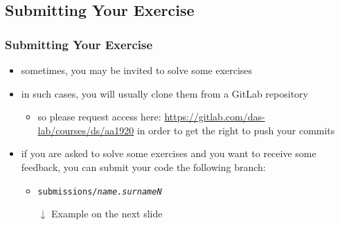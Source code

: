 \documentclass[handout]{beamer}\mode<presentation>{\usetheme{AMSCesenaPurpleAndGold}}
\begin{document}
\subsection{Submitting Your Exercise}

\begin{frame}%
\frametitle{Submitting Your Exercise}

    \begin{itemize}

        \item sometimes, you may be invited to solve some exercises
        
        \item in such cases, you will usually clone them from a GitLab repository
        \begin{itemize}
            \item so please request access here: \url{https://gitlab.com/das-lab/courses/ds/aa1920} in order to get the right to push your commits
        \end{itemize}
        
        \item if you are asked to solve some exercises and you want to receive some feedback, you can submit your code  the following \alert{branch}:
        \begin{itemize}
            
            \item \texttt{submissions/\alert{\textit{name.surnameN}}}%
            
            \vspace{.3cm}
        
            
            
            \vspace{.3cm}
            
            \item[$\downarrow$] Example on the next slide

        \end{itemize}

    \end{itemize}
\end{frame}
\end{document}
